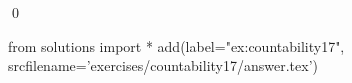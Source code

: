 
\begin{ex} 
  \label{ex:countability17}
  
  \qed
\end{ex} 
\begin{python0}
from solutions import *
add(label="ex:countability17",
    srcfilename='exercises/countability17/answer.tex') 
\end{python0}

